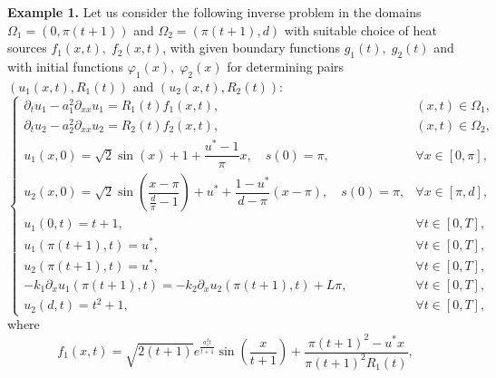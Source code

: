 \documentclass[preprint,12pt,authoryear]{elsarticle}
\begin{document}
\textbf{Example 1.} Let us consider the following inverse problem in the domains $\Omega_1=(0,\pi(t+1))$ and $\Omega_2=(\pi(t+1),d)$ with suitable choice of heat sources $f_1(x,t),\;f_2(x,t)$, with given boundary functions $g_1(t),\;g_2(t)$ and with initial functions $\varphi_1(x),\;\varphi_2(x)$ for determining pairs $(u_1(x,t),R_1(t))$ and $(u_2(x,t),R_2(t))$:
\begin{equation}\label{ex-1}
    \begin{cases}
        \partial_t u_1-a_1^2\partial_{xx}u_1=R_1(t)f_1(x,t),&(x,t)\in\Omega_1,\\
        \partial_t u_2-a_2^2\partial_{xx}u_2=R_2(t)f_2(x,t),&(x,t)\in\Omega_2,\\
        u_1(x,0)=\sqrt{2}\sin(x)+1+\dfrac{u^*-1}{\pi}x,\quad s(0)=\pi,&\forall x\in[0,\pi],\\
        u_2(x,0)=\sqrt{2}\sin\left(\dfrac{x-\pi}{\frac{d}{\pi}-1}\right)+u^*+\dfrac{1-u^*}{d-\pi}(x-\pi),\quad s(0)=\pi,&\forall x\in[\pi,d],\\
        u_1(0,t)=t+1,&\forall t\in[0,T],\\
        u_1(\pi(t+1),t)=u^*,&\forall t\in[0,T],\\
        u_2(\pi(t+1),t)=u^*,&\forall t\in[0,T],\\
        -k_1\partial_x u_1(\pi(t+1),t)=-k_2\partial_x u_2(\pi(t+1),t)+L\pi,&\forall t\in[0,T],\\
        u_2(d,t)=t^2+1,&\forall t\in[0,T],
    \end{cases}
\end{equation}
where 
$$f_1(x,t)=\sqrt{2(t+1)}e^{\frac{a_1^2t}{t+1}}\sin\left(\frac{x}{t+1}\right)+\dfrac{\pi(t+1)^2-u^*x}{\pi(t+1)^2R_1(t)},$$
\end{document}
